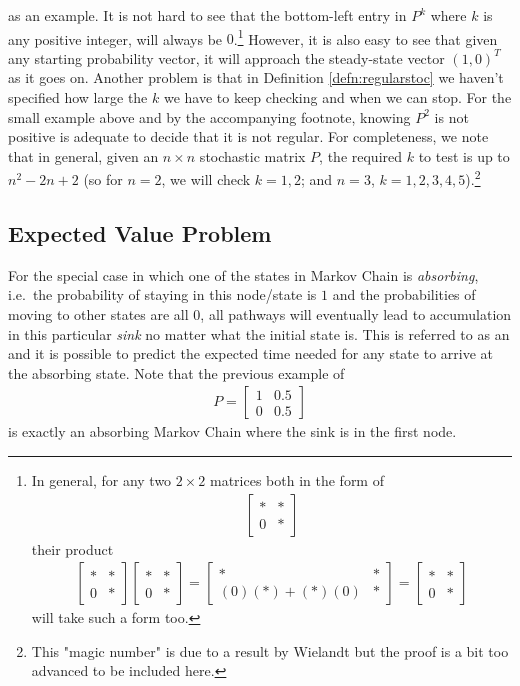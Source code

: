 as an example. It is not hard to see that the bottom-left entry in $P^k$ where $k$ is any positive integer, will always be $0$.\footnote{In general, for any two $2 \times 2$ matrices both in the form of
\begin{align*}
\begin{bmatrix}
* & * \\
0 & *    
\end{bmatrix}
\end{align*} their product
\begin{align*}
\begin{bmatrix}
* & * \\
0 & *    
\end{bmatrix}
\begin{bmatrix}
* & * \\
0 & *    
\end{bmatrix}
=
\begin{bmatrix}
* & * \\
(0)(*) + (*)(0) & *    
\end{bmatrix}
=
\begin{bmatrix}
* & * \\
0 & *    
\end{bmatrix}
\end{align*} will take such a form too.} However, it is also easy to see that given any starting probability vector, it will approach the steady-state vector $(1,0)^T$ as it goes on. Another problem is that in Definition \ref{defn:regularstoc} we haven't specified how large the $k$ we have to keep checking and when we can stop. For the small example above and by the accompanying footnote, knowing $P^2$ is not positive is adequate to decide that it is not regular. For completeness, we note that in general, given an $n \times n$ stochastic matrix $P$, the required $k$ to test is up to $n^2 - 2n + 2$ (so for $n = 2$, we will check $k = 1,2$; and $n = 3$, $k = 1,2,3,4,5$).\footnote{This "magic number" is due to a result by Wielandt but the proof is a bit too advanced to be included here.}

\subsection{Expected Value Problem}
For the special case in which one of the states in Markov Chain is \textit{absorbing}, i.e.\ the probability of staying in this node/state is $1$ and the probabilities of moving to other states are all $0$, all pathways will eventually lead to accumulation in this particular \textit{sink} no matter what the initial state is. This is referred to as an  and it is possible to predict the expected time needed for any state to arrive at the absorbing state. Note that the previous example of
\begin{align*}
P = 
\begin{bmatrix}
1 & 0.5 \\
0 & 0.5
\end{bmatrix}    
\end{align*}
is exactly an absorbing Markov Chain where the sink is in the first node.
\par

